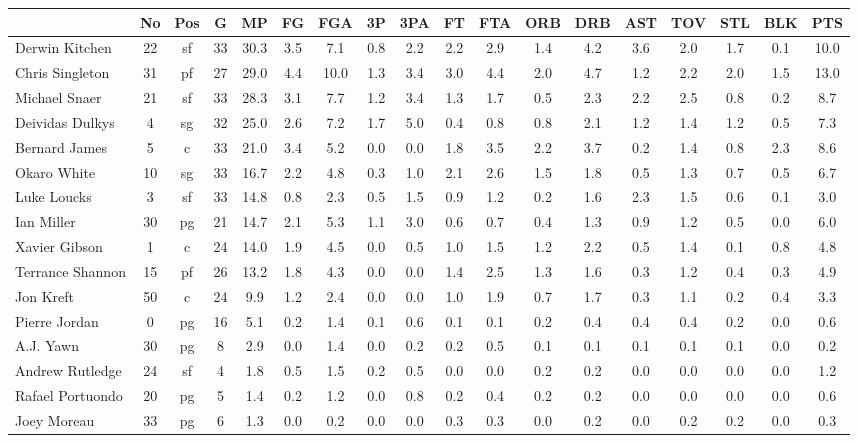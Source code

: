 \documentclass[10pt,letterpaper]{article}
\begin{document}
\begin{table}[ht]
\begin{center}
\begin{tabular}{lccccccccccccccccc}
  \hline
 & No & Pos & G & MP & FG & FGA & 3P & 3PA & FT & FTA & ORB & DRB & AST & TOV & STL & BLK & PTS \\ 
  \hline
Derwin Kitchen & 22 & sf & 33 & 30.3 & 3.5 & 7.1 & 0.8 & 2.2 & 2.2 & 2.9 & 1.4 & 4.2 & 3.6 & 2.0 & 1.7 & 0.1 & 10.0 \\ 
  Chris Singleton & 31 & pf & 27 & 29.0 & 4.4 & 10.0 & 1.3 & 3.4 & 3.0 & 4.4 & 2.0 & 4.7 & 1.2 & 2.2 & 2.0 & 1.5 & 13.0 \\ 
  Michael Snaer & 21 & sf & 33 & 28.3 & 3.1 & 7.7 & 1.2 & 3.4 & 1.3 & 1.7 & 0.5 & 2.3 & 2.2 & 2.5 & 0.8 & 0.2 & 8.7 \\ 
  Deividas Dulkys & 4 & sg & 32 & 25.0 & 2.6 & 7.2 & 1.7 & 5.0 & 0.4 & 0.8 & 0.8 & 2.1 & 1.2 & 1.4 & 1.2 & 0.5 & 7.3 \\ 
  Bernard James & 5 & c & 33 & 21.0 & 3.4 & 5.2 & 0.0 & 0.0 & 1.8 & 3.5 & 2.2 & 3.7 & 0.2 & 1.4 & 0.8 & 2.3 & 8.6 \\ 
  Okaro White & 10 & sg & 33 & 16.7 & 2.2 & 4.8 & 0.3 & 1.0 & 2.1 & 2.6 & 1.5 & 1.8 & 0.5 & 1.3 & 0.7 & 0.5 & 6.7 \\ 
  Luke Loucks & 3 & sf & 33 & 14.8 & 0.8 & 2.3 & 0.5 & 1.5 & 0.9 & 1.2 & 0.2 & 1.6 & 2.3 & 1.5 & 0.6 & 0.1 & 3.0 \\ 
  Ian Miller & 30 & pg & 21 & 14.7 & 2.1 & 5.3 & 1.1 & 3.0 & 0.6 & 0.7 & 0.4 & 1.3 & 0.9 & 1.2 & 0.5 & 0.0 & 6.0 \\ 
  Xavier Gibson & 1 & c & 24 & 14.0 & 1.9 & 4.5 & 0.0 & 0.5 & 1.0 & 1.5 & 1.2 & 2.2 & 0.5 & 1.4 & 0.1 & 0.8 & 4.8 \\ 
  Terrance Shannon & 15 & pf & 26 & 13.2 & 1.8 & 4.3 & 0.0 & 0.0 & 1.4 & 2.5 & 1.3 & 1.6 & 0.3 & 1.2 & 0.4 & 0.3 & 4.9 \\ 
  Jon Kreft & 50 & c & 24 & 9.9 & 1.2 & 2.4 & 0.0 & 0.0 & 1.0 & 1.9 & 0.7 & 1.7 & 0.3 & 1.1 & 0.2 & 0.4 & 3.3 \\ 
  Pierre Jordan & 0 & pg & 16 & 5.1 & 0.2 & 1.4 & 0.1 & 0.6 & 0.1 & 0.1 & 0.2 & 0.4 & 0.4 & 0.4 & 0.2 & 0.0 & 0.6 \\ 
  A.J. Yawn & 30 & pg & 8 & 2.9 & 0.0 & 1.4 & 0.0 & 0.2 & 0.2 & 0.5 & 0.1 & 0.1 & 0.1 & 0.1 & 0.1 & 0.0 & 0.2 \\ 
  Andrew Rutledge & 24 & sf & 4 & 1.8 & 0.5 & 1.5 & 0.2 & 0.5 & 0.0 & 0.0 & 0.2 & 0.2 & 0.0 & 0.0 & 0.0 & 0.0 & 1.2 \\ 
  Rafael Portuondo & 20 & pg & 5 & 1.4 & 0.2 & 1.2 & 0.0 & 0.8 & 0.2 & 0.4 & 0.2 & 0.2 & 0.0 & 0.0 & 0.0 & 0.0 & 0.6 \\ 
  Joey Moreau & 33 & pg & 6 & 1.3 & 0.0 & 0.2 & 0.0 & 0.0 & 0.3 & 0.3 & 0.0 & 0.2 & 0.0 & 0.2 & 0.2 & 0.0 & 0.3 \\ 
   \hline
\end{tabular}
\end{center}
\end{table}
\end{document}
